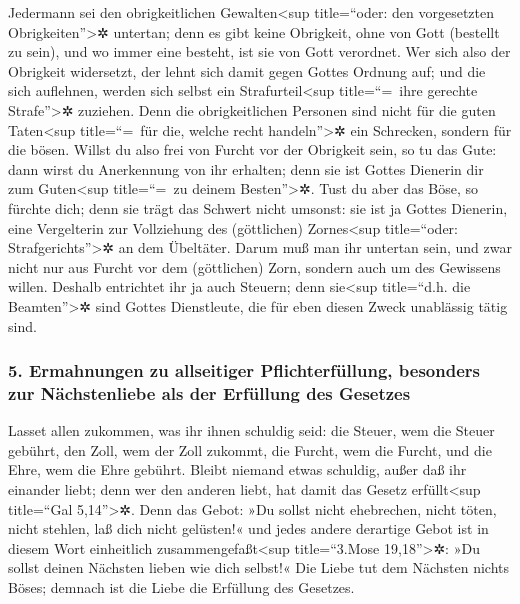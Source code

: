 Jedermann sei den obrigkeitlichen Gewalten\textless sup
title=``oder: den vorgesetzten Obrigkeiten''\textgreater✲ untertan; denn
es gibt keine Obrigkeit, ohne von Gott (bestellt zu sein), und wo immer
eine besteht, ist sie von Gott verordnet.  Wer sich also
der Obrigkeit widersetzt, der lehnt sich damit gegen Gottes Ordnung auf;
und die sich auflehnen, werden sich selbst ein Strafurteil\textless sup
title=``=~ihre gerechte Strafe''\textgreater✲ zuziehen. 
Denn die obrigkeitlichen Personen sind nicht für die guten
Taten\textless sup title=``=~für die, welche recht
handeln''\textgreater✲ ein Schrecken, sondern für die bösen. Willst du
also frei von Furcht vor der Obrigkeit sein, so tu das Gute: dann wirst
du Anerkennung von ihr erhalten;  denn sie ist Gottes
Dienerin dir zum Guten\textless sup title=``=~zu deinem
Besten''\textgreater✲. Tust du aber das Böse, so fürchte dich; denn sie
trägt das Schwert nicht umsonst: sie ist ja Gottes Dienerin, eine
Vergelterin zur Vollziehung des (göttlichen) Zornes\textless sup
title=``oder: Strafgerichts''\textgreater✲ an dem Übeltäter.
 Darum muß man ihr untertan sein, und zwar nicht nur aus
Furcht vor dem (göttlichen) Zorn, sondern auch um des Gewissens willen.
 Deshalb entrichtet ihr ja auch Steuern; denn
sie\textless sup title=``d.h. die Beamten''\textgreater✲ sind Gottes
Dienstleute, die für eben diesen Zweck unablässig tätig sind.

\hypertarget{ermahnungen-zu-allseitiger-pflichterfuxfcllung-besonders-zur-nuxe4chstenliebe-als-der-erfuxfcllung-des-gesetzes}{%
\subsubsection{5. Ermahnungen zu allseitiger Pflichterfüllung, besonders
zur Nächstenliebe als der Erfüllung des
Gesetzes}\label{ermahnungen-zu-allseitiger-pflichterfuxfcllung-besonders-zur-nuxe4chstenliebe-als-der-erfuxfcllung-des-gesetzes}}

 Lasset allen zukommen, was ihr ihnen schuldig seid: die
Steuer, wem die Steuer gebührt, den Zoll, wem der Zoll zukommt, die
Furcht, wem die Furcht, und die Ehre, wem die Ehre gebührt.
 Bleibt niemand etwas schuldig, außer daß ihr einander
liebt; denn wer den anderen liebt, hat damit das Gesetz
erfüllt\textless sup title=``Gal 5,14''\textgreater✲. 
Denn das Gebot: »Du sollst nicht ehebrechen, nicht töten, nicht stehlen,
laß dich nicht gelüsten!« und jedes andere derartige Gebot ist in diesem
Wort einheitlich zusammengefaßt\textless sup title=``3.Mose
19,18''\textgreater✲: »Du sollst deinen Nächsten lieben wie dich
selbst!«  Die Liebe tut dem Nächsten nichts Böses;
demnach ist die Liebe die Erfüllung des Gesetzes.


